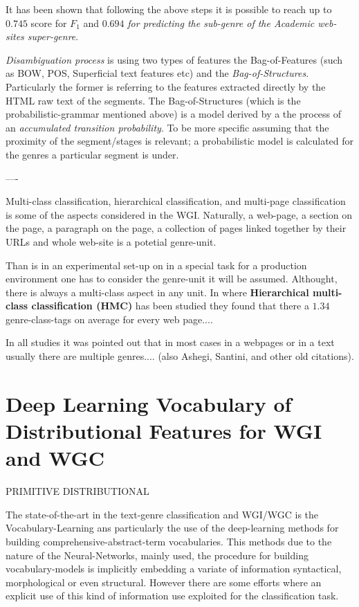 It has been shown that following the above steps it is possible to reach up to $0.745$ score for $F_{1}$ and $0.694$\textit{ for predicting the sub-genre of the Academic web-sites super-genre}. 

\textit{Disambiguation process} is using two types of features the Bag-of-Features (such as BOW, POS, Superficial text features etc) and the \textit{Bag-of-Structures}. Particularly the former is referring to the features extracted directly by the HTML raw text of the segments. The Bag-of-Structures (which is the probabilistic-grammar mentioned above) is a model derived by a the process of an \textit{accumulated transition probability}. To be more specific assuming that the proximity of the segment/stages is relevant; a probabilistic model is calculated for the genres a particular segment is under.

----

Multi-class classification, hierarchical classification, and multi-page classification is some of the aspects considered in the WGI. Naturally, a web-page, a section on the page, a paragraph on the page, a collection of pages linked together by their URLs and whole web-site is a potetial genre-unit. 

Than is in an experimental set-up on in a special task for a production environment one has to consider the genre-unit it will be assumed. Althought, there is always a multi-class aspect in any unit. In \parencite{madjarov2015web} where \textbf{Hierarchical multi-class classification (HMC)} has been studied they found that there a $1.34$ genre-class-tags on average for every web page....

In all studies it was pointed out that in most cases in a webpages or in a text usually there are multiple genres.... \parencite{lee2017text} (also Ashegi, Santini, and other old citations).

\section{Deep Learning Vocabulary of Distributional Features for WGI and WGC}\label{chap:relevant_work:sec:intro}


PRIMITIVE DISTRIBUTIONAL \parencite{kim2010formulating} 


The state-of-the-art in the text-genre classification and WGI/WGC is the Vocabulary-Learning ans particularly the use of the deep-learning methods for building comprehensive-abstract-term vocabularies. This methods due to the nature of the Neural-Networks, mainly used,  the procedure for building vocabulary-models is implicitly embedding a variate of information syntactical, morphological or even structural. However there are some efforts where an explicit use of this kind of information use exploited for the classification task. 

